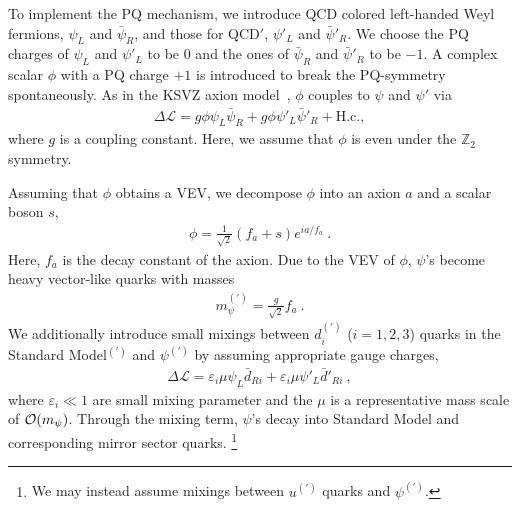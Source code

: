 \documentclass[aps,amsmath,preprint,epsf,superscriptaddress,nofootinbib,notitlepage]{revtex4-1}
\begin{document}
To implement the PQ mechanism, we introduce QCD colored left-handed Weyl fermions, $\psi_L$ and $\bar\psi_R$, 
and those for QCD${}'$, $\psi'_L$ and $\bar\psi'_R$.
We choose the PQ charges of $\psi_L$ and $\psi'_L$ to be $0$ and the ones of $\bar \psi_R$ and $\bar\psi'_R$ to be $-1$.
A complex scalar $\phi$ with a PQ charge $+1$  is introduced to break the PQ-symmetry spontaneously.
As in the KSVZ axion model~\cite{Kim:1979if,Shifman:1979if}, $\phi$ couples to  $\psi$ and $\psi'$ via
\begin{eqnarray}
\label{eq:PQInt}
\Delta \mathcal L = g\phi \psi_L\bar{\psi}_R + g\phi \psi'_L\bar{\psi}'_R + \text{H.c.},
\end{eqnarray}
where $g$ is a coupling constant.
Here, we assume that $\phi$ is even under the  $\mathbb Z_2$  symmetry.

Assuming that $\phi$ obtains a VEV, we decompose $\phi$ into an axion $a$ and a scalar boson $s$,
\begin{eqnarray}
\phi = \frac{1}{\sqrt{2}}(f_a + s) e^{i a/f_a}\ .
\label{eq:phi}
\end{eqnarray}
Here, $f_a$ is the decay constant of the axion.
Due to the VEV of $\phi$, $\psi$'s become heavy vector-like quarks with masses
\begin{eqnarray}
\label{eq:massextra}
m_{\psi}^{(\prime)} = \frac{g}{\sqrt{2}} f_a\ .
\end{eqnarray}
We additionally introduce small mixings between $d^{(\prime)}_i$ ($i=1,2,3$) quarks in the Standard Model${}^{(\prime)}$ and $\psi^{(\prime)}$ by assuming appropriate gauge charges,
\begin{eqnarray}
\label{eq:SMMixing}
\Delta \mathcal L = \varepsilon_i \mu \psi_L\bar d_{Ri} + \varepsilon_i \mu \psi'_L\bar d'_{Ri}\ ,
\end{eqnarray}
where $\varepsilon_i \ll 1$ are small mixing parameter and the $\mu$ is a representative mass scale of ${\cal O}(m_\psi)$.
Through the mixing term, $\psi$'s decay into Standard Model and corresponding mirror sector quarks.%
\footnote{We may instead assume mixings between $u^{(\prime)}$ quarks and $\psi^{(\prime)}$.} 
\end{document}
